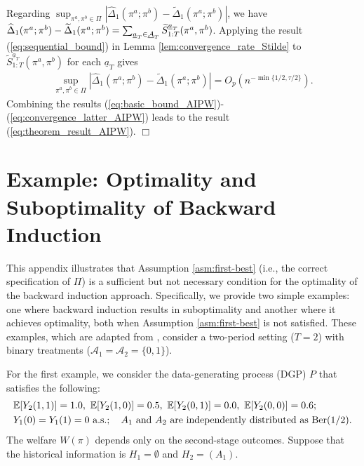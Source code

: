 Regarding $\sup_{\pi^{a},\pi^{b} \in \Pi} |\widehat{\Delta}_{1}(\pi^{a};\pi^{b}) - \widetilde{\Delta}_{1}(\pi^{a};\pi^{b})|$, we have $\widehat{\Delta}_{1}(\pi^{a};\pi^{b}) - \widetilde{\Delta}_{1}(\pi^{a};\pi^{b}) = \sum_{\underline{a}_{T} \in \underline{\mathcal{A}}_{T}} \widetilde{S}_{1:T}^{\underline{a}_{T}}(\pi^{a},\pi^{b})$.
Applying the result (\ref{eq:sequential_bound}) in Lemma \ref{lem:convergence_rate_Stilde} to $\widetilde{S}_{1:T}^{\underline{a}_{T}}(\pi^{a},\pi^{b})$ for each $\underline{a}_{T}$ gives
\begin{align}
  \sup_{\pi^{a},\pi^{b} \in \Pi} |\widehat{\Delta}_{1}(\pi^{a};\pi^{b}) - \widetilde{\Delta}_{1}(\pi^{a};\pi^{b})|  =  O_{p}\left(n^{-\min\{1/2,\tau/2\}}\right). \label{eq:convergence_latter_AIPW}
\end{align}
Combining the results (\ref{eq:basic_bound_AIPW})-(\ref{eq:convergence_latter_AIPW}) leads to the result  (\ref{eq:theorem_result_AIPW}).
\hfill {\large $\Box$}



\setcounter{equation}{0}
\renewcommand{\theequation}{D.\arabic{equation}}

\section{Example: Optimality and Suboptimality of Backward Induction}
\label{app:suboptimallity_backward_induction}

This appendix illustrates that Assumption \ref{asm:first-best} (i.e., the correct specification of $\Pi$) is a sufficient but not necessary condition for the optimality of the backward induction approach. Specifically, we provide two simple examples: one where backward induction results in suboptimality and another where it achieves optimality, both when Assumption \ref{asm:first-best} is not satisfied. These examples, which are adapted from \cite{Sakaguchi_2021}, consider a two-period setting ($T=2$) with binary treatments ($\mathcal{A}_{1} = \mathcal{A}_{2} = \{0,1\}$). 

For the first example, we consider the data-generating process (DGP) $P$ that satisfies the following:
\begin{align}
    & \E[Y_{2}(1,1)]=1.0,\ \E[Y_{2}(1,0)]=0.5,\ \E[Y_{2}(0,1)]=0.0,\ \E[Y_{2}(0,0)]=0.6; \nonumber \\
    & Y_1(0) = Y_1(1) = 0 \mbox{\ a.s.}; \quad \mbox{$A_{1}$ and $A_{2}$ are independently distributed as $\text{Ber}(1/2)$}. \label{eq:example_DGP}
\end{align}
The welfare $W(\pi)$ depends only on the second-stage outcomes. Suppose that the historical information is $H_1 = \emptyset$ and $H_2 = (A_1)$.


